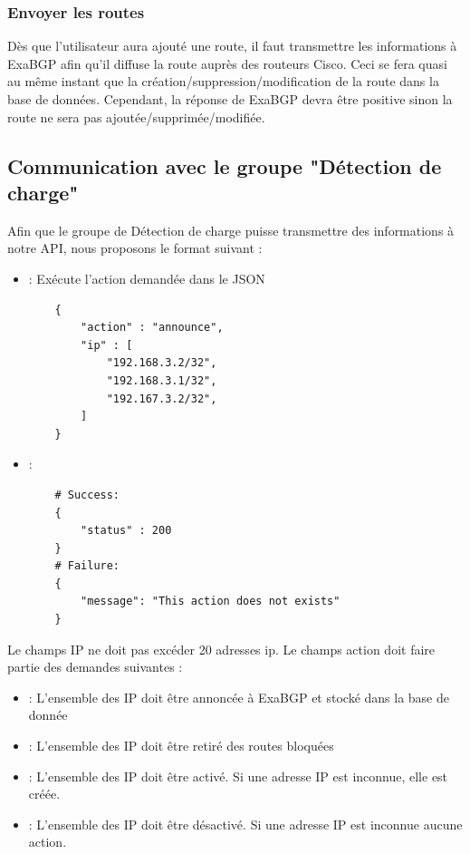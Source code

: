 \subsubsection{Envoyer les routes}
Dès que l'utilisateur aura ajouté une route, il faut transmettre les informations à ExaBGP afin qu'il diffuse la route auprès des routeurs Cisco. Ceci se fera quasi au même instant que la création/suppression/modification de la route dans la base de données. Cependant, la réponse de ExaBGP devra être positive sinon la route ne sera pas ajoutée/supprimée/modifiée.

\subsection{Communication avec le groupe "Détection de charge"}
Afin que le groupe de Détection de charge puisse transmettre des informations à notre API, nous proposons le format suivant :

\begin{itemize}

    \item [\textbf{POST /api/detection}] : Exécute l'action demandée dans le JSON
    \begin{verbatim}
    {
        "action" : "announce",
        "ip" : [
            "192.168.3.2/32",
            "192.168.3.1/32",
            "192.167.3.2/32",
        ]
    }
    \end{verbatim}
    \item [\textbf{Réponse à l'action exécutée}] :
    
    \begin{verbatim}
    # Success:
    {
        "status" : 200
    }
    # Failure:
    {
        "message": "This action does not exists"
    }
    \end{verbatim}

\end{itemize}

Le champs IP ne doit pas excéder 20 adresses ip. 
Le champs action doit faire partie des demandes suivantes :

\begin{itemize}
    \item[\textbf{announce}] : L'ensemble des IP doit être annoncée à ExaBGP et stocké dans la base de donnée
    \item[\textbf{withdraw}] : L'ensemble des IP doit être retiré des routes bloquées
    \item[\textbf{activate}] : L'ensemble des IP doit être activé. Si une adresse IP est inconnue, elle est créée.
    \item[\textbf{deactivate}] : L'ensemble des IP doit être désactivé. Si une adresse IP est inconnue aucune action.
\end{itemize}

